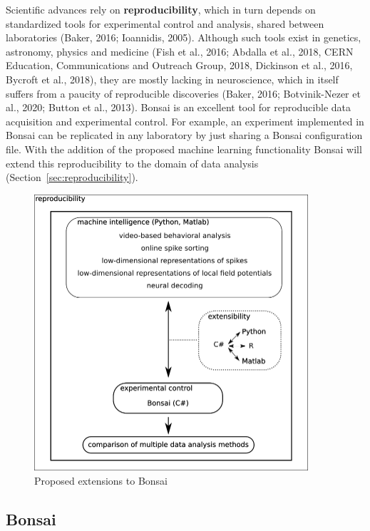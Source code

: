 Scientific advances rely on \textbf{reproducibility}, which in turn depends on standardized tools for experimental control and analysis, shared between laboratories (Baker, 2016; Ioannidis, 2005). Although such tools exist in genetics, astronomy, physics and medicine (Fish et al., 2016; Abdalla et al., 2018, CERN Education, Communications and Outreach Group, 2018, Dickinson et al., 2016, Bycroft et al., 2018), they are mostly lacking in neuroscience, which in itself suffers from a paucity of reproducible discoveries (Baker, 2016; Botvinik-Nezer et al., 2020; Button et al., 2013). Bonsai is an excellent tool for reproducible data acquisition and experimental control. For example, an experiment implemented in Bonsai can be replicated in
any laboratory by just sharing a Bonsai configuration file. With the addition of the proposed machine learning functionality Bonsai will extend this
reproducibility to the domain of data analysis
(Section~\ref{sec:reproducibility}).

\begin{figure}
  \includegraphics[width=4in]{figures/proposed_bonsai_extensions.png}
  \caption{Proposed extensions to Bonsai}
  \label{fig:proposedBonsaiExtensions}
\end{figure}

\subsection{Bonsai}
\label{sec:bonsai}


